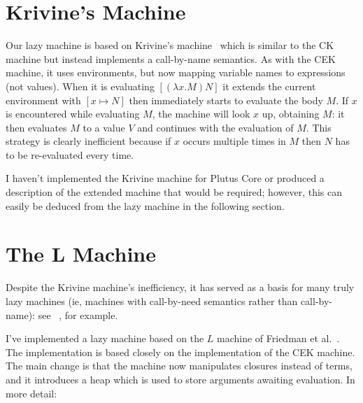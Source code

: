 \documentclass[a4paper]{article}
\begin{document}
\section{Krivine's Machine}
Our lazy machine is based on Krivine's machine~\cite{Krivine} which is
similar to the CK machine but instead implements a call-by-name
semantics.  As with the CEK machine, it uses environments, but now
mapping variable names to expressions (not values).  When it is
evaluating $[(\lambda x.M) N]$ it extends the current environment with
$[x \mapsto N]$ then immediately starts to evaluate the body $M$.  If
$x$ is encountered while evaluating $M$, the machine will look $x$ up,
obtaining $M$: it then evaluates $M$ to a value $V$ and continues with
the evaluation of $M$.  This strategy is clearly inefficient because
if $x$ occurs multiple times in $M$ then $N$ has to be re-evaluated
every time.

I haven't implemented the Krivine machine for Plutus Core or produced
a description of the extended machine that would be required; however,
this can easily be deduced from the lazy machine in the following
section.

\newpage


\section{The L Machine}
Despite the Krivine machine's inefficiency, it has served as a basis
for many truly lazy machines (ie, machines with call-by-need
semantics rather than call-by-name): see ~\cite{Sestoft, Friedman,
  Douence}, for example.

I've implemented a lazy machine based on the $L$ machine of Friedman
et al.~\cite{Friedman}.  The implementation is based closely on the
implementation of the CEK machine.  The main change is that the
machine now manipulates closures instead of terms, and it introduces a
heap which is used to store arguments awaiting evaluation.  In more
detail:
\end{document}
